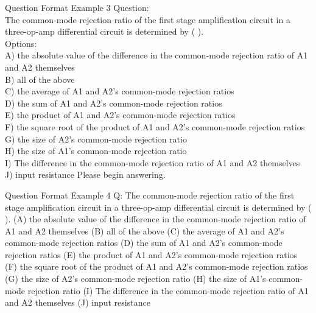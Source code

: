 \begin{promptbox}{Question Format Example 3}
Question:  
\\
The common-mode rejection ratio of the first stage amplification circuit in a three-op-amp differential circuit is determined by ( ).  
\\
Options:  
\\
A) the absolute value of the difference in the common-mode rejection ratio of A1 and A2 themselves  
\\
B) all of the above  
\\
C) the average of A1 and A2's common-mode rejection ratios  
\\
D) the sum of A1 and A2's common-mode rejection ratios  
\\
E) the product of A1 and A2's common-mode rejection ratios  
\\
F) the square root of the product of A1 and A2's common-mode 
rejection ratios  
\\
G) the size of A2's common-mode rejection ratio  
\\
H) the size of A1's common-mode rejection ratio  
\\
I) The difference in the common-mode rejection ratio of A1 and A2 themselves  
\\
J) input resistance  
Please begin answering.  

\end{promptbox}







\begin{promptbox}{Question Format Example 4}
Q: The common-mode rejection ratio of the first stage amplification circuit in a three-op-amp differential circuit is determined by ( ).  
(A) the absolute value of the difference in the common-mode rejection ratio of A1 and A2 themselves (B) all of the above (C) the average of A1 and A2's common-mode rejection ratios (D) the sum of A1 and A2's common-mode rejection ratios (E) the product of A1 and A2's common-mode rejection ratios (F) the square root of the product of A1 and A2's common-mode rejection ratios (G) the size of A2's common-mode rejection ratio (H) the size of A1's common-mode rejection ratio (I) The difference in the common-mode rejection ratio of A1 and A2 themselves (J) input resistance

\end{promptbox}




